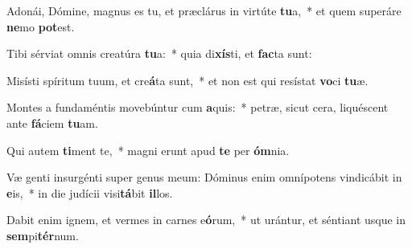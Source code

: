 \item Adonái, Dómine, magnus es tu, et præclárus in virtúte \textbf{tu}a,~* et quem superáre \textbf{ne}mo \textbf{pot}est.
\item Tibi sérviat omnis creatúra \textbf{tu}a:~* quia di\textbf{xís}ti, et \textbf{fac}ta sunt:
\item Misísti spíritum tuum, et cre\textbf{á}ta sunt,~* et non est qui resístat \textbf{vo}ci \textbf{tu}æ.
\item Montes a fundaméntis movebúntur cum \textbf{a}quis:~* petræ, sicut cera, liquéscent ante \textbf{fá}ciem \textbf{tu}am.
\item Qui autem \textbf{ti}ment te,~* magni erunt apud \textbf{te} per \textbf{óm}nia.
\item Væ genti insurgénti super genus meum: Dóminus enim omnípotens vindicábit in \textbf{e}is,~* in die judícii visi\textbf{tá}bit \textbf{il}los.
\item Dabit enim ignem, et vermes in carnes e\textbf{ó}rum,~* ut urántur, et séntiant usque in \textbf{sem}pi\textbf{tér}num.
